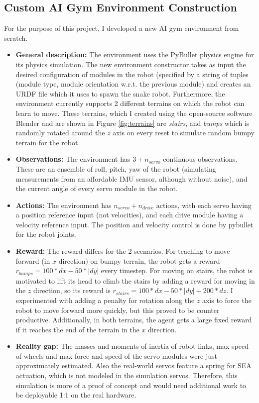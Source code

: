 \documentclass{article}
\begin{document}
\subsection{Custom AI Gym Environment Construction}
For the purpose of this project, I developed a new AI gym environment from scratch.
\begin{itemize}
  \item \textbf{General description:} The environment uses the PyBullet physics engine for its physics simulation. 
The new environment constructor takes as input the desired configuration of modules in the robot (specified by a string of tuples (module type, module orientation w.r.t. the previous module) and creates an URDF file which it uses to spawn the snake robot.
Furthermore, the environment currently supports 2 different terrains on which the robot can learn to move.
    These terrains, which I created using the open-source software Blender and are shown in Figure \ref{fig:terrains} are \textit{stairs}, and \textit{bumps} which is randomly rotated around the $z$ axis on every reset to simulate random bumpy terrain for the robot.
  \item \textbf{Observations:} The environment has $3+ n_{servo}$ continuous observations. These are an ensemble of roll, pitch, yaw of the robot (simulating measurements from an affordable IMU sensor, although without noise), and the current angle of every servo module in the robot.
  \item \textbf{Actions:}  The environment has $n_{servo} + n_{drive}$ actions, with each servo having a position reference input (not velocities), and each drive module having a velocity reference input. The position and velocity control is done by pybullet for the robot joints.
  \item \textbf{Reward:} The reward differs for the 2 scenarios. For teaching to move forward (in $x$ direction) on bumpy terrain, the robot gets a reward $r_{bumps} = 100*dx - 50*|dy|$ every timestep. For moving on stairs, the robot is motivated to lift its head to climb the stairs by adding a reward for moving in the $z$ direction, so its reward is $r_{stairs} = 100*dx - 50*|dy| + 200*dz$.
    I experimented with adding a penalty for rotation along the $z$ axis to force the robot to move forward more quickly, but this proved to be counter productive.
    Additionally, in both terrains, the agent gets a large fixed reward if it reaches the end of the terrain in the $x$ direction.
  \item \textbf{Reality gap:} The masses and moments of inertia of robot links, max speed of wheels and max force and speed of the servo modules were just approximately estimated. Also the real-world servos feature a spring for SEA actuation, which is not modeled in the simulation servos.
    Therefore, this simulation is more of a proof of concept and would need additional work to be deployable 1:1 on the real hardware.
\end{itemize}
\end{document}
